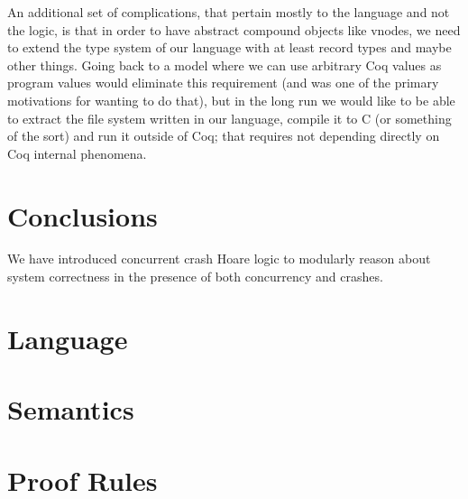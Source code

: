 An additional set of complications, that pertain mostly to the
language and not the logic, is that in order to have abstract compound
objects like vnodes, we need to extend the type system of our language
with at least record types and maybe other things.
Going back to a model where we can use arbitrary Coq values as program
values would eliminate this requirement (and was one of the primary
motivations for wanting to do that), but in the long run we would
like to be able to extract the file system written in our language,
compile it to C (or something of the sort) and run it outside of Coq;
that requires not depending directly on Coq internal phenomena.

\section{Conclusions}
\label{sec:conclusions}

We have introduced concurrent crash Hoare logic to modularly reason about system
correctness in the presence of both concurrency and crashes. 

\appendix
\section{Language}
\label{sec:appendix_ast}
\section{Semantics}
\label{sec:appendix_semantics}
\section{Proof Rules}
\label{sec:appendix_logic}
